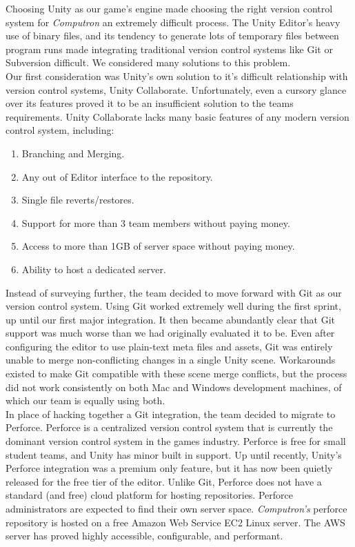 Choosing Unity as our game's engine made choosing the right version control system 
for \textit{Computron} an extremely difficult process. The Unity Editor's heavy use of 
binary files, and its tendency to generate lots of temporary files between program runs 
made integrating traditional version control systems like Git or Subversion difficult. We 
considered many solutions to this problem.\\

Our first consideration was Unity's own solution to it's difficult relationship with version 
control systems, Unity Collaborate. Unfortunately, even a cursory glance over its 
features proved it to be an insufficient solution to the teams requirements. Unity Collaborate 
lacks many basic features of any modern version control system, including: 
\begin{enumerate}
	\item Branching and Merging.
	\item Any out of Editor interface to the repository.
	\item Single file reverts/restores.
	\item Support for more than 3 team members without paying money.
	\item Access to more than 1GB of server space without paying money.
	\item Ability to host a dedicated server.
\end{enumerate}


Instead of surveying further, the team decided to move forward with Git as our version 
control system. Using Git worked extremely well during the first sprint, up until our first 
major integration. It then became abundantly clear that Git support was much worse than 
we had originally evaluated it to be. Even after configuring the editor to use plain-text meta 
files and assets, Git was entirely unable to merge non-conflicting changes in a single Unity 
scene. Workarounds existed to make Git compatible with these scene merge conflicts, but 
the process did not work consistently on both Mac and Windows development machines, 
of which our team is equally using both.\\

In place of hacking together a Git integration, the team decided to migrate to Perforce. 
Perforce is a centralized version control system that is currently the dominant version control 
system in the games industry. Perforce is free for small student teams, and Unity has minor 
built in support. Up until recently, Unity's Perforce integration was a premium only feature, 
but it has now been quietly released for the free tier of the editor. Unlike Git, Perforce does 
not have a standard (and free) cloud platform for hosting repositories. Perforce administrators 
are expected to find their own server space. \textit{Computron's} perforce repository is hosted 
on a free Amazon Web Service EC2 Linux server. The AWS server has proved highly accessible, 
configurable, and performant. \\

